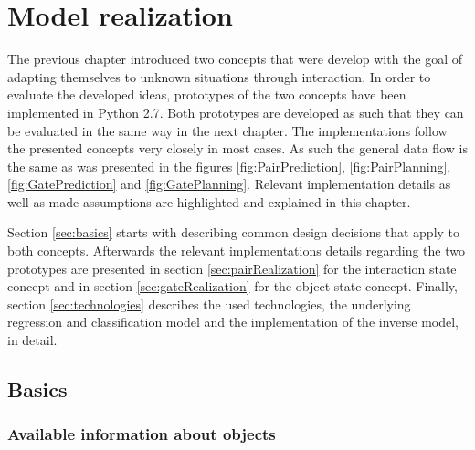 \chapter{Model realization\label{chap:modelReal}}



The previous chapter introduced two concepts that were develop with the goal of adapting themselves to unknown situations through interaction.
In order to evaluate the developed ideas, prototypes of the two concepts have been implemented in Python 2.7. Both prototypes are developed as such that they can be evaluated in the same way in the next chapter. The implementations follow the presented concepts very closely in most cases. As such the general data flow is the same as was presented in the figures  \ref{fig:PairPrediction}, \ref{fig:PairPlanning}, \ref{fig:GatePrediction} and \ref{fig:GatePlanning}.
Relevant implementation details as well as made assumptions are highlighted and explained in this chapter.

Section \ref{sec:basics} starts with describing common design decisions that apply to both concepts. Afterwards the relevant implementations details regarding the two prototypes are presented in section \ref{sec:pairRealization} for the interaction state concept and in section \ref{sec:gateRealization} for the object state concept. Finally, section \ref{sec:technologies} describes the used technologies, the underlying regression and classification model and the implementation of the inverse model, in detail.

\section{Basics \label{sec:basics}}

\subsection{Available information about objects}

